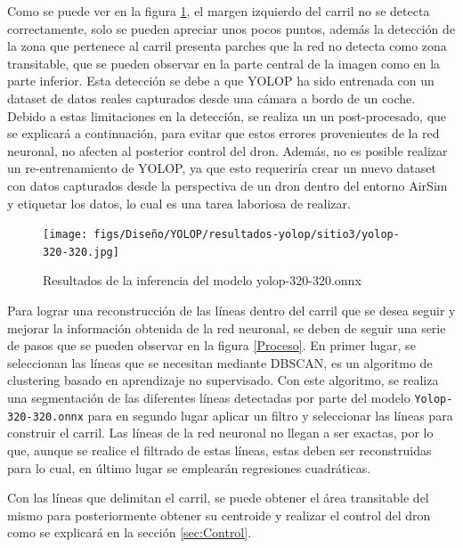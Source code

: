 Como se puede ver en la figura \ref{f:Inferencia320-320}, el margen izquierdo del carril no se detecta correctamente, solo se pueden apreciar unos pocos puntos, además la detección 
de la zona que pertenece al carril presenta parches que la red no detecta como zona transitable, que se pueden observar en la parte central de la imagen como en la parte inferior. Esta detección 
se debe a que YOLOP ha sido entrenada con un dataset de datos reales capturados desde una cámara a bordo de un coche. Debido a estas limitaciones en la detección, se realiza un 
un post-procesado, que se explicará a continuación, para evitar que estos errores provenientes de la red neuronal, no afecten al posterior control del dron. Además, no es posible 
realizar un re-entrenamiento de YOLOP, ya que esto requeriría crear un nuevo dataset con datos capturados desde la perspectiva de un dron dentro del entorno AirSim y etiquetar los datos, 
lo cual es una tarea laboriosa de realizar.
\begin{figure} [H]
  \begin{center}
    \texttt{[image: figs/Diseño/YOLOP/resultados-yolop/sitio3/yolop-320-320.jpg]}
  \end{center}
  \caption{Resultados de la inferencia del modelo yolop-320-320.onnx}
  \label{f:Inferencia320-320}
  \vspace{-1.5em}
\end{figure}

Para lograr una reconstrucción de las líneas dentro del carril que se desea seguir y mejorar la información obtenida de la red neuronal, se deben de seguir una serie de pasos que se pueden observar 
en la figura \ref{Proceso}. En primer lugar, se seleccionan las líneas que se necesitan mediante DBSCAN, 
es un algoritmo de clustering basado en aprendizaje no supervisado. 
Con este algoritmo, se realiza una segmentación de las diferentes líneas detectadas por parte del modelo \texttt{Yolop-320-320.onnx} para en segundo lugar aplicar un filtro y seleccionar las líneas 
para construir el carril. Las líneas de la red neuronal no llegan a ser exactas, por lo que, aunque se realice el filtrado de estas líneas, estas deben ser reconstruidas para lo cual, en último lugar 
se emplearán regresiones cuadráticas.

Con las líneas que delimitan el carril, se puede obtener el área transitable del mismo para posteriormente obtener su centroide y realizar el control del dron como se explicará en la sección 
\ref{sec:Control}. \\

